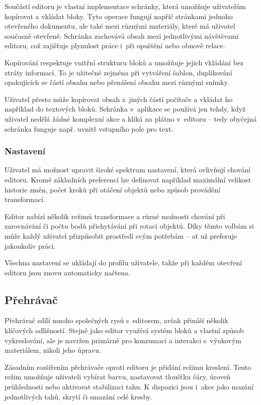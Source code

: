 Součástí editoru je vlastní implementace schránky, která umožňuje uživatelům kopírovat a vkládat bloky. 
Tyto operace fungují napříč stránkami jednoho otevřeného dokumentu, ale také mezi různými materiály, které má uživatel současně otevřené. 
Schránka zachovává obsah mezi jednotlivými návštěvami editoru, což zajišťuje plynulost práce i~při opuštění nebo obnově relace.

Kopírování respektuje vnitřní strukturu bloků a umožňuje jejich vkládání bez ztráty informací. 
To je užitečné zejména při vytváření šablon, duplikování opakujících se částí obsahu nebo přenášení obsahu mezi různými snímky.

Uživatel přesto může kopírovat obsah z~jiných částí počítače a vkládat ho například do textových bloků.
Schránka v~aplikace se používá jen tehdy, když uživatel nedělá žádné komplexní akce a kliká na plátno v~editoru -- tedy obyčejná schránka funguje např. uvnitř vstupního pole pro text.

\subsubsection{Nastavení}

Uživatel má možnost upravit široké spektrum nastavení, která ovlivňují chování editoru. 
Kromě základních preferencí lze definovat například maximální velikost historie změn, počet kroků při otáčení objektů nebo způsob provádění transformací.

Editor nabízí několik režimů transformace a různé možnosti chování při zarovnávání či počtu bodů přichytávání při rotaci objektů. 
Díky těmto volbám si může každý uživatel přizpůsobit prostředí svým potřebám -- ať už preferuje jakoukoliv práci.

Všechna nastavení se ukládají do profilu uživatele, takže při každém otevření editoru jsou znovu automaticky načtena.

\subsection{Přehrávač}

Přehrávač sdílí mnoho společných rysů s~editorem, avšak přináší několik klíčových odlišností. 
Stejně jako editor využívá systém bloků a vlastní způsob vykreslování, ale je navržen primárně pro konzumaci a interakci s~výukovým materiálem, nikoli jeho úpravu.

Zásadním rozšířením přehrávače oproti editoru je přidání režimu kreslení. 
Tento režim umožňuje uživateli vybírat barvu, nastavovat tloušťku čáry, úroveň průhlednosti nebo aktivovat stabilizaci tahu. 
K dispozici jsou i~akce jako mazání jednotlivých tahů, skrytí či smazání celé kresby.

